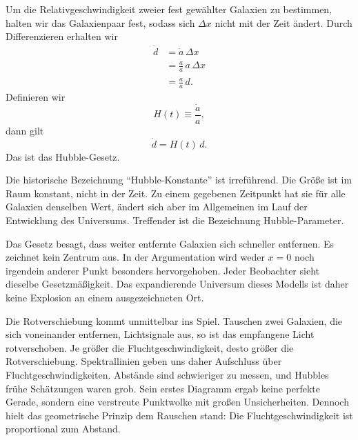 Um die Relativgeschwindigkeit zweier fest gewählter Galaxien zu bestimmen, halten wir das Galaxienpaar fest, sodass sich \(\Delta x\) nicht mit der Zeit ändert. Durch Differenzieren erhalten wir
\begin{align}
\dot d &= \dot a\,\Delta x \\
       &= \frac{\dot a}{a}\,a\,\Delta x \\
       &= \frac{\dot a}{a}\,d.
\end{align}
Definieren wir
\begin{equation}
H(t)\equiv \frac{\dot a}{a},
\end{equation}
dann gilt
\begin{equation}
\dot d = H(t)\,d.
\end{equation}
Das ist das Hubble-Gesetz.

Die historische Bezeichnung ``Hubble-Konstante'' ist irreführend. Die Größe ist im Raum konstant, nicht in der Zeit. Zu einem gegebenen Zeitpunkt hat sie für alle Galaxien denselben Wert, ändert sich aber im Allgemeinen im Lauf der Entwicklung des Universums. Treffender ist die Bezeichnung Hubble-Parameter.

Das Gesetz besagt, dass weiter entfernte Galaxien sich schneller entfernen. Es zeichnet kein Zentrum aus. In der Argumentation wird weder \(x=0\) noch irgendein anderer Punkt besonders hervorgehoben. Jeder Beobachter sieht dieselbe Gesetzmäßigkeit. Das expandierende Universum dieses Modells ist daher keine Explosion an einem ausgezeichneten Ort.

Die Rotverschiebung kommt unmittelbar ins Spiel. Tauschen zwei Galaxien, die sich voneinander entfernen, Lichtsignale aus, so ist das empfangene Licht rotverschoben. Je größer die Fluchtgeschwindigkeit, desto größer die Rotverschiebung. Spektrallinien geben uns daher Aufschluss über Fluchtgeschwindigkeiten. Abstände sind schwieriger zu messen, und Hubbles frühe Schätzungen waren grob. Sein erstes Diagramm ergab keine perfekte Gerade, sondern eine verstreute Punktwolke mit großen Unsicherheiten. Dennoch hielt das geometrische Prinzip dem Rauschen stand: Die Fluchtgeschwindigkeit ist proportional zum Abstand.

\begin{classroomqa}
\end{classroomqa}

